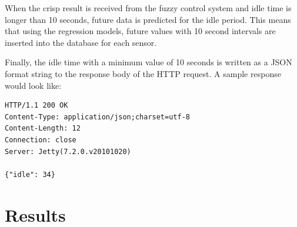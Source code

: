 When the crisp result is received from the fuzzy control system and idle time is longer than 10 seconds, future data is predicted for the idle period. This means that using the regression models, future values with 10 second intervals are inserted into the database for each sensor. 

Finally, the idle time with a minimum value of 10 seconds is written as a JSON format string to the response body of the HTTP request. A sample response would look like:\\ 

\begin{lstlisting}
HTTP/1.1 200 OK
Content-Type: application/json;charset=utf-8
Content-Length: 12
Connection: close
Server: Jetty(7.2.0.v20101020)

{"idle": 34}
\end{lstlisting}

\section{Results}
\\
\\



